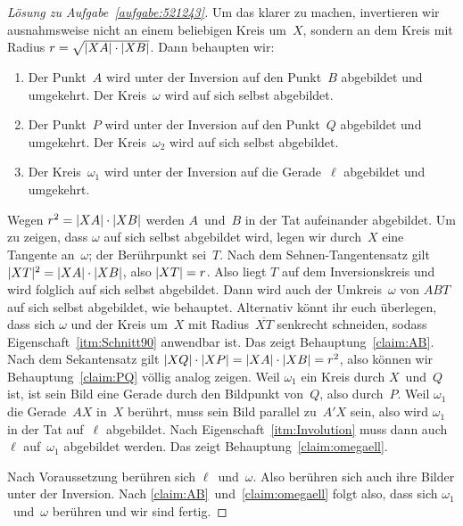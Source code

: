 \begin{proof}[Lösung zu Aufgabe~\ref{aufgabe:521243}]
	Um das klarer zu machen, invertieren wir ausnahmsweise nicht an einem beliebigen Kreis um~$X$, sondern an dem Kreis mit Radius $r=\sqrt{\lvert XA\rvert\cdot\lvert XB\rvert}$. Dann behaupten wir:
	\begin{enumerate}[label={$(\arabic*)$},ref={$(\arabic*)$}]\itshape
		\item \label{claim:AB}
		Der Punkt~$A$ wird unter der Inversion auf den Punkt~$B$ abgebildet und umgekehrt. Der Kreis~$\omega$ wird auf sich selbst abgebildet.
		\item \label{claim:PQ}
		Der Punkt~$P$ wird unter der Inversion auf den Punkt~$Q$ abgebildet und umgekehrt. Der Kreis~$\omega_2$ wird auf sich selbst abgebildet.
		\item \label{claim:omegaell}
		Der Kreis~$\omega_1$ wird unter der Inversion auf die Gerade~$\ell$ abgebildet und umgekehrt.
	\end{enumerate}
	Wegen $r^2=\lvert XA\rvert\cdot\lvert XB\rvert$ werden $A$~und~$B$ in der Tat aufeinander abgebildet. Um zu zeigen, dass $\omega$ auf sich selbst abgebildet wird, legen wir durch~$X$ eine Tangente an~$\omega$; der Berührpunkt sei~$T$. Nach dem Sehnen-Tangentensatz gilt $\lvert XT\rvert^2=\lvert XA\rvert\cdot\lvert XB\rvert$, also $\lvert XT\rvert=r$.
	Also liegt $T$ auf dem Inversionskreis und wird folglich auf sich selbst abgebildet. Dann wird auch der Umkreis~$\omega$ von $ABT$ auf sich selbst abgebildet, wie behauptet. Alternativ könnt ihr euch überlegen, dass sich $\omega$ und der Kreis um~$X$ mit Radius~$\overline{XT}$ senkrecht schneiden, sodass Eigenschaft~\ref{itm:Schnitt90} anwendbar ist. Das zeigt Behauptung~\ref{claim:AB}. Nach dem Sekantensatz gilt $\lvert XQ\rvert\cdot \lvert XP\rvert=\lvert XA\rvert\cdot\lvert XB\rvert=r^2$, also können wir Behauptung~\ref{claim:PQ} völlig analog zeigen. Weil $\omega_1$ ein Kreis durch $X$~und~$Q$ ist, ist sein Bild eine Gerade durch den Bildpunkt von~$Q$, also durch~$P$. Weil $\omega_1$ die Gerade~$AX$ in~$X$ berührt, muss sein Bild parallel zu~$A'X$ sein, also wird $\omega_1$ in der Tat auf~$\ell$ abgebildet. Nach Eigenschaft~\ref{itm:Involution} muss dann auch~$\ell$ auf~$\omega_1$ abgebildet werden. Das zeigt Behauptung~\ref{claim:omegaell}.
	
	Nach Voraussetzung berühren sich $\ell$~und~$\omega$. Also berühren sich auch ihre Bilder unter der Inversion. Nach \ref{claim:AB}~und~\ref{claim:omegaell} folgt also, dass sich $\omega_1$~und~$\omega$ berühren und wir sind fertig.
\end{proof}


